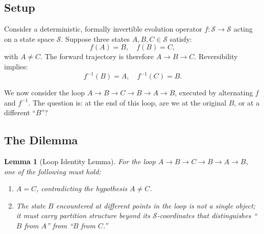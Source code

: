 \documentclass[twocolumn,10pt,a4paper]{article}
\newtheorem{lemma}[theorem]{Lemma}
\theoremstyle{definition}
\theoremstyle{remark}
\newcommand{\StateSpace}{\mathcal{S}}
\begin{document}
\subsection{Setup}

Consider a deterministic, formally invertible evolution operator $f: \StateSpace \to \StateSpace$ acting on a state space $\StateSpace$. Suppose three states $A, B, C \in \StateSpace$ satisfy:
\begin{equation}
    f(A) = B, \quad f(B) = C,
    \label{eq:abc}
\end{equation}
with $A \neq C$. The forward trajectory is therefore $A \to B \to C$. Reversibility implies:
\begin{equation}
    f^{-1}(B) = A, \quad f^{-1}(C) = B.
    \label{eq:abc-reverse}
\end{equation}

We now consider the loop $A \to B \to C \to B \to A \to B$, executed by alternating $f$ and $f^{-1}$. The question is: at the end of this loop, are we at the original $B$, or at a different ``$B$''?

\subsection{The Dilemma}

\begin{lemma}[Loop Identity Lemma]
\label{lem:loop}
For the loop $A \to B \to C \to B \to A \to B$, one of the following must hold:
\begin{enumerate}[leftmargin=1.5em,itemsep=0.2em]
    \item[(i)] $A = C$, contradicting the hypothesis $A \neq C$.
    \item[(ii)] The state $B$ encountered at different points in the loop is not a single object; it must carry partition structure beyond its $\StateSpace$-coordinates that distinguishes ``$B$ from $A$'' from ``$B$ from $C$.''
\end{enumerate}
\end{lemma}
\end{document}
